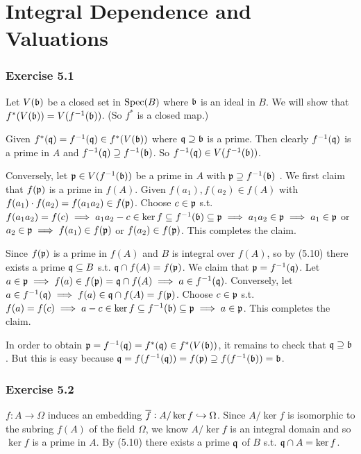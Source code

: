 \documentclass[../A&M.tex]{subfiles}
\begin{document}
\chapter{Integral Dependence and Valuations}

\subsection*{Exercise 5.1}

Let $V(\mathfrak{b})$ be a closed set in $\operatorname{Spec}(B)$ where $\mathfrak{b}$ is an ideal in $B$. We will show that $f^*(V(\mathfrak{b})) = V(f^{-1}(\mathfrak{b}))$. (So $f^*$ is a closed map.)

Given $f^*(\mathfrak{q}) = f^{-1}(\mathfrak{q}) \in f^*(V(\mathfrak{b}))$ where $\mathfrak{q} \supseteq \mathfrak{b}$ is a prime. Then clearly $f^{-1}(\mathfrak{q})$ is a prime in $A$ and $f^{-1}(\mathfrak{q}) \supseteq f^{-1}(\mathfrak{b})$. So $f^{-1}(\mathfrak{q}) \in V(f^{-1}(\mathfrak{b}))$.

Conversely, let $\mathfrak{p} \in V(f^{-1}(\mathfrak{b}))$ be a prime in $A$ with $\mathfrak{p} \supseteq f^{-1}(\mathfrak{b})$ . We first claim that $f(\mathfrak{p})$ is a prime in $f(A)$. Given $f(a_1),f(a_2) \in f(A)$ with $f(a_1)\cdot f(a_2) = f(a_1a_2) \in f(\mathfrak{p})$. Choose $c \in \mathfrak{p}$ s.t. $f(a_1a_2) = f(c) \implies a_1a_2-c \in \ker f \subseteq f^{-1}(\mathfrak{b}) \subseteq \mathfrak{p} \implies a_1a_2 \in \mathfrak{p} \implies a_1 \in \mathfrak{p}$ or $a_2 \in \mathfrak{p} \implies f(a_1) \in f(\mathfrak{p})$ or $f(a_2) \in f(\mathfrak{p})$. This completes the claim.

Since $f(\mathfrak{p})$ is a prime in $f(A)$ and $B$ is integral over $f(A)$, so by (5.10) there exists a prime $\mathfrak{q} \subseteq B$ s.t. $\mathfrak{q} \cap f(A) = f(\mathfrak{p})$. We claim that $\mathfrak{p} = f^{-1}(\mathfrak{q})$. Let $a\in\mathfrak{p} \implies f(a) \in f(\mathfrak{p}) = \mathfrak{q} \cap f(A) \implies a \in f^{-1}(\mathfrak{q})$. Conversely, let $a\in f^{-1}(\mathfrak{q}) \implies f(a) \in \mathfrak{q} \cap f(A) = f(\mathfrak{p})$. Choose $c\in\mathfrak{p}$ s.t. $f(a)=f(c) \implies a-c \in \ker f \subseteq f^{-1}(\mathfrak{b}) \subseteq \mathfrak{p} \implies a \in \mathfrak{p}$. This completes the claim.

In order to obtain $\mathfrak{p} = f^{-1}(\mathfrak{q}) = f^*(\mathfrak{q}) \in f^*(V(\mathfrak{b}))$, it remains to check that $\mathfrak{q} \supseteq \mathfrak{b}$. But this is easy because $\mathfrak{q} = f(f^{-1}(\mathfrak{q})) = f(\mathfrak{p}) \supseteq f(f^{-1}(\mathfrak{b})) = \mathfrak{b}$.

\subsection*{Exercise 5.2}

$f:A \to \Omega$ induces an embedding $\overline{f}: A/\ker f \hookrightarrow \Omega$. Since $A/\ker f$ is isomorphic to the subring $f(A)$ of the field $\Omega$, we know $A/\ker f$ is an integral domain and so $\ker f$ is a prime in $A$. By (5.10) there exists a prime $\mathfrak{q}$ of $B$ s.t. $\mathfrak{q} \cap A = \ker f$.
\end{document}
